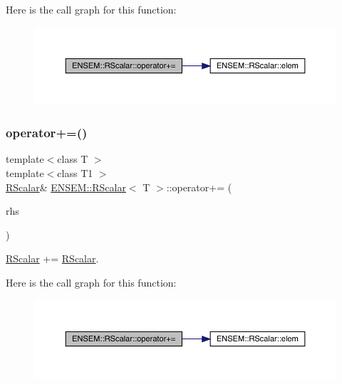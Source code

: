 Here is the call graph for this function\+:
\nopagebreak
\begin{figure}[H]
\begin{center}
\leavevmode
\includegraphics[width=350pt]{d0/d8c/classENSEM_1_1RScalar_adc6bf2610b8af0ab175ef00d9194aa1d_cgraph}
\end{center}
\end{figure}
\mbox{\label{classENSEM_1_1RScalar_adc6bf2610b8af0ab175ef00d9194aa1d}} 
\subsubsection{\texorpdfstring{operator+=()}{operator+=()}\hspace{0.1cm}{\footnotesize\ttfamily [2/3]}}
{\footnotesize\ttfamily template$<$class T $>$ \\
template$<$class T1 $>$ \\
\mbox{\hyperlink{classENSEM_1_1RScalar}{R\+Scalar}}\& \mbox{\hyperlink{classENSEM_1_1RScalar}{E\+N\+S\+E\+M\+::\+R\+Scalar}}$<$ T $>$\+::operator+= (\begin{DoxyParamCaption}\item[{const \mbox{\hyperlink{classENSEM_1_1RScalar}{R\+Scalar}}$<$ T1 $>$ \&}]{rhs }\end{DoxyParamCaption})\hspace{0.3cm}{\ttfamily [inline]}}



\mbox{\hyperlink{classENSEM_1_1RScalar}{R\+Scalar}} += \mbox{\hyperlink{classENSEM_1_1RScalar}{R\+Scalar}}. 

Here is the call graph for this function\+:
\nopagebreak
\begin{figure}[H]
\begin{center}
\leavevmode
\includegraphics[width=350pt]{d0/d8c/classENSEM_1_1RScalar_adc6bf2610b8af0ab175ef00d9194aa1d_cgraph}
\end{center}
\end{figure}
\mbox{\label{classENSEM_1_1RScalar_adc6bf2610b8af0ab175ef00d9194aa1d}} 
